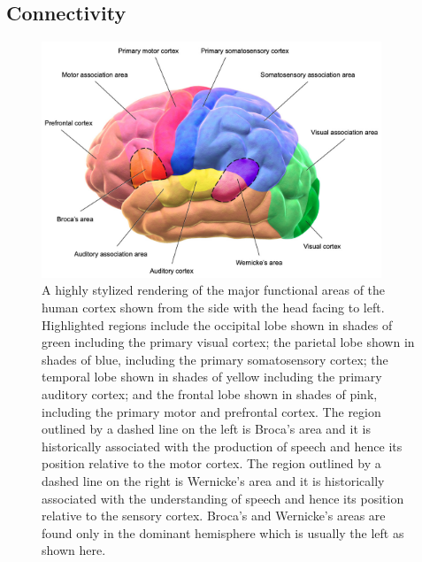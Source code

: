 \documentclass[letterpaper,11pt]{article}
\def\urlh#1{{}}
\begin{document}
\subsection{Connectivity}


\begin{figure}
%
  \begin{center} 
    \includegraphics[height=200pt]{./figures/Human_Brain_Neocortex_Function.jpg} 
  \end{center}
%
  \caption{A highly stylized rendering of the major functional areas of the human cortex shown from the side with the head facing to left. Highlighted regions include the occipital lobe shown in shades of green including the primary visual cortex; the parietal lobe shown in shades of blue, including the primary somatosensory cortex; the temporal lobe shown in shades of yellow including the primary auditory cortex; and the frontal lobe shown in shades of pink, including the primary motor and prefrontal cortex. The region outlined by a dashed line on the left is Broca's area and it is historically associated with the production of speech and hence its position relative to the motor cortex. The region outlined by a dashed line on the right is Wernicke’s area and it is historically associated with the understanding of speech and hence its position relative to the sensory cortex. Broca's and Wernicke's areas are found only in the dominant hemisphere which is usually the left as shown here.}
%
  \label{fig_necortex}
%
\end{figure}

\end{document}
